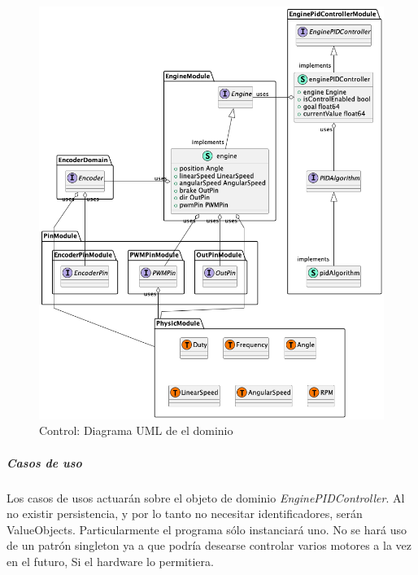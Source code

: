 \begin{figure}[H]
    \centering
    \includegraphics[height=0.6\textheight]{./part/Proyecto_ejecutivo/memoria_descriptiva/descripcionDelProyecto/control/uml/controlDomain}
    \caption{Control: Diagrama UML de el dominio}\label{fig:Control-Diagrama UML de el dominio}
\end{figure}

\subparagraph{Casos de uso}

Los casos de usos actuarán sobre el objeto de dominio \textit{EnginePIDController}.
Al no existir persistencia, y por lo tanto no necesitar identificadores, serán ValueObjects.
Particularmente el programa sólo instanciará uno.
No se hará uso de un patrón singleton ya a que podría desearse controlar varios motores a la vez en el futuro, Si el hardware lo permitiera.


